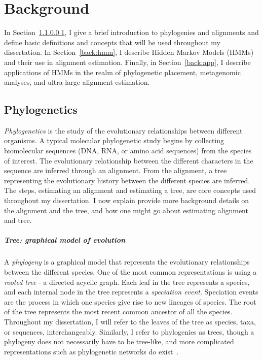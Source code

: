 \chapter{Background}
\label{background}%
In Section~\ref{back:phylogenetics}, I give a brief introduction to phylogenies and alignments and define basic definitions and concepts that will be used throughout my dissertation.  In Section~\ref{back:hmm}, I describe Hidden Markov Models (HMMs) and their use in alignment estimation. Finally, in Section~\ref{back:app}, I describe applications of HMMs in the realm of phylogenetic placement, metagenomic analyses, and ultra-large alignment estimation.

\section{Phylogenetics}
\emph{Phylogenetics} is the study of the evolutionary relationships between different organisms.  A typical molecular phylogenetic study begins by collecting biomolecular sequences (DNA, RNA, or amino acid sequences) from the species of interest.  The evolutionary relationship between the different characters in the sequence are inferred through an alignment.  From the alignment, a tree representing the evolutionary history between the different species are inferred.  The steps, estimating an alignment and estimating a tree, are core concepts used throughout my dissertation.  I now explain provide more background details on the alignment and the tree, and how one might go about estimating alignment and tree.

\paragraph{Tree: graphical model of evolution}\label{back:phylogenetics}
A \emph{phylogeny} is a graphical model that represents the evolutionary relationships between the different species.  One of the most common representations is using a \emph{rooted tree} - a directed acyclic graph.  Each leaf in the tree represents a species, and each internal node in the tree represents a \emph{speciation event}.  Speciation events are the process in which one species give rise to new lineages of species.  The root of the tree represents the most recent common ancestor of all the species.  Throughout my dissertation, I will refer to the leaves of the tree as species, taxa, or sequences, interchangeably.  Similarly, I refer to phylogenies as trees, though a phylogeny does not necessarily have to be tree-like, and more complicated representations such as phylogenetic networks do exist~\cite{todo}.

